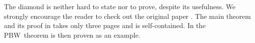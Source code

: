 \begin{remark}
	The diamond is neither hard to state nor to prove, despite its usefulness.
	We strongly encourage the reader to check out the original paper \cite{diamond_lemma}.
	The main theorem and its proof in \cite[\S 1]{diamond_lemma} takes only three pages and is self-contained.
	In \cite[\S 3]{diamond_lemma} the PBW~theorem is then proven as an example.
\end{remark}





